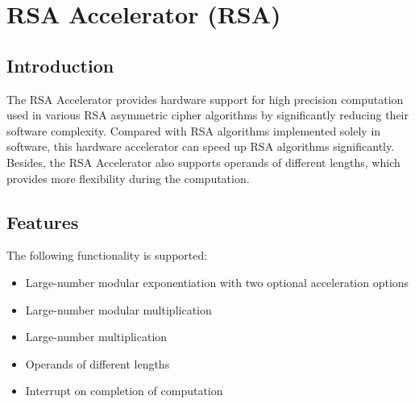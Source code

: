 \documentclass[main\_\_EN.tex]{subfiles}
\begin{document}
\setenglishformatting

\ifglobal
\else
    {\let\clearpage\relax \listoftodos}
    {\let\clearpage\relax \listofdonetodos}
    \tableofcontents
\fi



\hypertarget{rsa}{}
\chapter{RSA Accelerator (RSA)}\label{mod:rsa}
\section{Introduction}

The RSA Accelerator provides hardware support for high precision computation used in various RSA asymmetric cipher algorithms by significantly reducing their software complexity. Compared with RSA algorithms implemented solely in software, this hardware accelerator can speed up RSA algorithms significantly. Besides, the RSA Accelerator also supports operands of different lengths, which provides more flexibility during the computation.
\section{Features}

The following functionality is supported:

\begin{itemize}
    \item Large-number modular exponentiation with two optional acceleration options
    \item Large-number modular multiplication
    \item Large-number multiplication
    \item Operands of different lengths
    \item Interrupt on completion of computation
\end{itemize}
\end{document}
